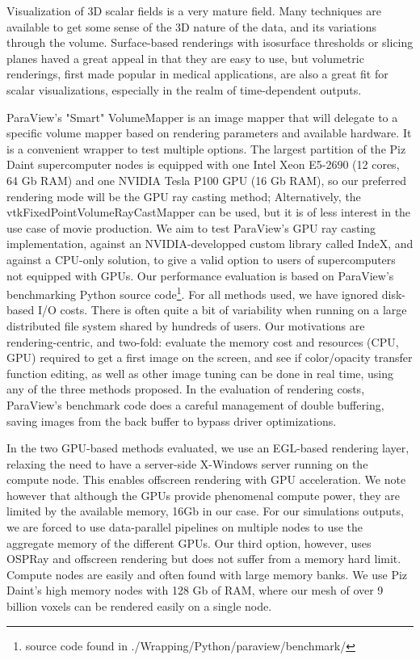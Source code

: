 \documentclass[final,5p,times,twocolumn]{elsarticle}
\begin{document}
Visualization of 3D scalar fields is a very mature field. Many techniques are
available to get some sense of the 3D nature of the data, and its variations
through the volume. Surface-based renderings with isosurface thresholds or
slicing planes haved a great appeal in that they are easy to use, but volumetric
renderings, first made popular in medical applications, are also a great fit for
scalar visualizations, especially in the realm of time-dependent outputs.

ParaView's "Smart" VolumeMapper is an image mapper
that will delegate to a specific volume mapper based on rendering parameters and
available hardware. It is a convenient
wrapper to test multiple options. The largest partition of the Piz Daint supercomputer
nodes is equipped with one Intel Xeon E5-2690 (12 cores, 64 Gb RAM) and one NVIDIA
Tesla P100 GPU (16 Gb RAM), so our preferred rendering mode will be the GPU ray
casting method;
Alternatively, the vtkFixedPointVolumeRayCastMapper can be used, but it is of
less interest in the use case of movie production. We aim to test ParaView's GPU
ray casting implementation, against an NVIDIA-developped custom library called
IndeX, and against a CPU-only solution, to give a valid option to users of
supercomputers not equipped with GPUs.
Our performance evaluation is based on ParaView's benchmarking Python source
code\footnote{source code found in ./Wrapping/Python/paraview/benchmark/}.
\newline
For all methods used, we have ignored disk-based I/O costs. There is often quite
a bit of variability when running on a large distributed file system shared by
hundreds of users. Our motivations are rendering-centric, and two-fold:
evaluate the memory cost and resources (CPU, GPU) required to get a first image
on the screen, and see if color/opacity transfer
function editing, as well as other image tuning can be done in real time, using
any of the three methods proposed. In the evaluation of rendering costs, ParaView's
benchmark code does a careful management of double buffering, saving images from
the back buffer to bypass driver optimizations.

In the two GPU-based methods evaluated, we use an EGL-based rendering layer,
relaxing the need to have a server-side X-Windows server running on the compute node.
This enables offscreen rendering with GPU acceleration. We note however that although
the GPUs provide phenomenal compute power, they are limited by the available memory,
16Gb in our case. For our simulations outputs, we are forced to use data-parallel
pipelines on multiple nodes to use the aggregate memory of the different GPUs.
\newline
Our third option, however, uses OSPRay and offscreen rendering but does not suffer
from a memory hard limit. Compute nodes are easily and often found with large memory
banks. We use Piz Daint's high memory nodes with 128 Gb of RAM, where our mesh of
over 9 billion voxels can be rendered easily on a single node.
\end{document}
